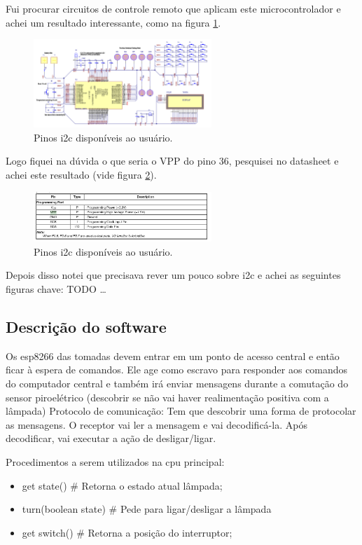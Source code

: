 \documentclass[11pt]{article}
\begin{document}
Fui procurar circuitos de controle remoto que aplicam este microcontrolador e achei um resultado interessante, como na figura \ref{fig:sh77_example}.

\begin{figure}[h!]
\caption{\label{fig:sh77_example}Pinos i2c disponíveis ao usuário.}
\centering
\includegraphics[width=0.6\textwidth]{./sh77_example.png}
\end{figure}

Logo fiquei na dúvida o que seria o VPP do pino 36, pesquisei no datasheet e achei este resultado (vide figura \ref{fig:vpp_meaning}).

\begin{figure}[h!]
\caption{\label{fig:vpp_meaning}Pinos i2c disponíveis ao usuário.}
\centering
\includegraphics[width=0.6\textwidth]{./vpp_meaning.png}
\end{figure}

Depois disso notei que precisava rever um pouco sobre i2c e achei as seguintes figuras chave:
TODO \ldots{}


\subsection{Descrição do software}
\label{sec:org2eb6e2c}
Os esp8266 das tomadas devem entrar em um ponto de acesso central e então ficar à espera de comandos. Ele age como escravo para responder aos comandos do computador central e também irá enviar mensagens durante a comutação do sensor piroelétrico (descobrir se não vai haver realimentação positiva com a lâmpada)
Protocolo de comunicação:
Tem que descobrir uma forma de protocolar as mensagens. O receptor vai ler a mensagem e vai decodificá-la. Após decodificar, vai executar a ação de desligar/ligar.


Procedimentos a serem utilizados na cpu principal:
\begin{itemize}
\item get state() \# Retorna o estado atual lâmpada;
\item turn(boolean state) \# Pede para ligar/desligar a lâmpada
\item get switch() \# Retorna a posição do interruptor;
\end{itemize}
\end{document}
